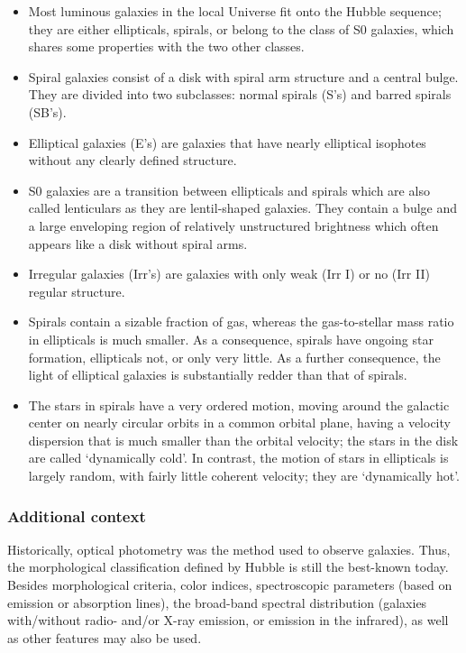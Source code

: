 \documentclass[a4paper,11pt]{article}
\begin{document}
\begin{itemize}
    \item Most luminous galaxies in the local Universe fit onto the Hubble sequence; they are either ellipticals, spirals, or belong to the class of S0 galaxies, which shares some properties with the two other classes.
    \item Spiral galaxies consist of a disk with spiral arm structure and a central bulge. They are divided into two subclasses: normal spirals (S's) and barred spirals (SB's).
    \item Elliptical galaxies (E's) are galaxies that have nearly elliptical isophotes without any clearly defined structure.
    \item S0 galaxies are a transition between ellipticals and spirals which are also called lenticulars as they are lentil-shaped galaxies. They contain a bulge and a large enveloping region of relatively unstructured brightness which often appears like a disk without spiral arms.
    \item Irregular galaxies (Irr's) are galaxies with only weak (Irr I) or no (Irr II) regular structure.
    \item Spirals contain a sizable fraction of gas, whereas the gas-to-stellar mass ratio in ellipticals is much smaller. As a consequence, spirals have ongoing star formation, ellipticals not, or only very little. As a further consequence, the light of elliptical galaxies is substantially redder than that of spirals.
    \item The stars in spirals have a very ordered motion, moving around the galactic center on nearly circular orbits in a common orbital plane, having a velocity dispersion that is much smaller than the orbital velocity; the stars in the disk are called `dynamically cold'. In contrast, the motion of stars in ellipticals is largely random, with fairly little coherent velocity; they are `dynamically hot'.
\end{itemize}

\subsubsection{Additional context}

Historically, optical photometry was the method used to observe galaxies. Thus, the morphological classification defined by Hubble is still the best-known today. Besides morphological criteria, color indices, spectroscopic parameters (based on emission or absorption lines), the broad-band spectral distribution (galaxies with/without radio- and/or X-ray emission, or emission in the infrared), as well as other features may also be used.
\end{document}
